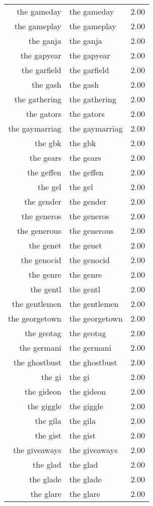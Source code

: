 \begin{table}[ht]
\begin{tabular}{rlr}
  the gameday & the gameday & 2.00 \\ 
  the gameplay & the gameplay & 2.00 \\ 
  the ganja & the ganja & 2.00 \\ 
  the gapyear & the gapyear & 2.00 \\ 
  the garfield & the garfield & 2.00 \\ 
  the gash & the gash & 2.00 \\ 
  the gathering & the gathering & 2.00 \\ 
  the gators & the gators & 2.00 \\ 
  the gaymarriag & the gaymarriag & 2.00 \\ 
  the gbk & the gbk & 2.00 \\ 
  the gears & the gears & 2.00 \\ 
  the geffen & the geffen & 2.00 \\ 
  the gel & the gel & 2.00 \\ 
  the gender & the gender & 2.00 \\ 
  the generos & the generos & 2.00 \\ 
  the generous & the generous & 2.00 \\ 
  the genet & the genet & 2.00 \\ 
  the genocid & the genocid & 2.00 \\ 
  the genre & the genre & 2.00 \\ 
  the gentl & the gentl & 2.00 \\ 
  the gentlemen & the gentlemen & 2.00 \\ 
  the georgetown & the georgetown & 2.00 \\ 
  the geotag & the geotag & 2.00 \\ 
  the germani & the germani & 2.00 \\ 
  the ghostbust & the ghostbust & 2.00 \\ 
  the gi & the gi & 2.00 \\ 
  the gideon & the gideon & 2.00 \\ 
  the giggle & the giggle & 2.00 \\ 
  the gila & the gila & 2.00 \\ 
  the gist & the gist & 2.00 \\ 
  the giveaways & the giveaways & 2.00 \\ 
  the glad & the glad & 2.00 \\ 
  the glade & the glade & 2.00 \\ 
  the glare & the glare & 2.00 \\ 

\end{tabular}
\end{table}
